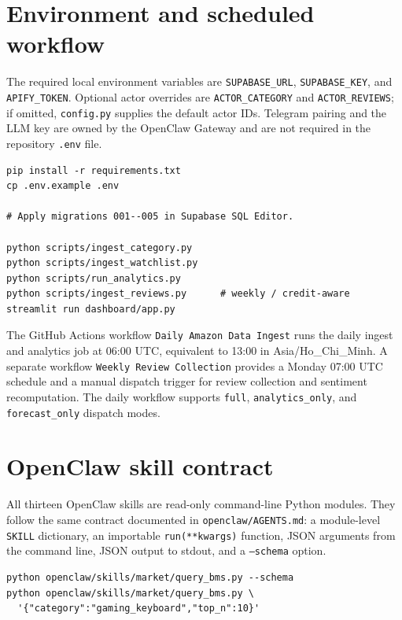 \section{Environment and scheduled workflow}

The required local environment variables are \texttt{SUPABASE\_URL}, \texttt{SUPABASE\_KEY}, and \texttt{APIFY\_TOKEN}. Optional actor overrides are \texttt{ACTOR\_CATEGORY} and \texttt{ACTOR\_REVIEWS}; if omitted, \texttt{config.py} supplies the default actor IDs. Telegram pairing and the LLM key are owned by the OpenClaw Gateway and are not required in the repository \texttt{.env} file.

\begin{lstlisting}
pip install -r requirements.txt
cp .env.example .env

# Apply migrations 001--005 in Supabase SQL Editor.

python scripts/ingest_category.py
python scripts/ingest_watchlist.py
python scripts/run_analytics.py
python scripts/ingest_reviews.py      # weekly / credit-aware
streamlit run dashboard/app.py
\end{lstlisting}

The GitHub Actions workflow \texttt{Daily Amazon Data Ingest} runs the daily ingest and analytics job at 06:00 UTC, equivalent to 13:00 in Asia/Ho\_Chi\_Minh. A separate workflow \texttt{Weekly Review Collection} provides a Monday 07:00 UTC schedule and a manual dispatch trigger for review collection and sentiment recomputation. The daily workflow supports \texttt{full}, \texttt{analytics\_only}, and \texttt{forecast\_only} dispatch modes.

\section{OpenClaw skill contract}

All thirteen OpenClaw skills are read-only command-line Python modules. They follow the same contract documented in \texttt{openclaw/AGENTS.md}: a module-level \texttt{SKILL} dictionary, an importable \texttt{run(**kwargs)} function, JSON arguments from the command line, JSON output to stdout, and a \texttt{--schema} option.

\begin{lstlisting}
python openclaw/skills/market/query_bms.py --schema
python openclaw/skills/market/query_bms.py \
  '{"category":"gaming_keyboard","top_n":10}'
\end{lstlisting}


